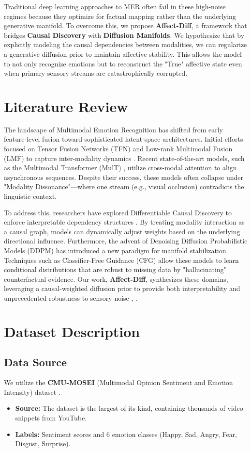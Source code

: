 \documentclass[conference]{IEEEtran}
\begin{document}
Traditional deep learning approaches to MER often fail in these high-noise regimes because they optimize for factual mapping rather than the underlying generative manifold. To overcome this, we propose \textbf{Affect-Diff}, a framework that bridges \textbf{Causal Discovery} with \textbf{Diffusion Manifolds}. We hypothesize that by explicitly modeling the causal dependencies between modalities, we can regularize a generative diffusion prior to maintain affective stability. This allows the model to not only recognize emotions but to reconstruct the "True" affective state even when primary sensory streams are catastrophically corrupted.

\section{Literature Review}
The landscape of Multimodal Emotion Recognition has shifted from early feature-level fusion toward sophisticated latent-space architectures. Initial efforts focused on Tensor Fusion Networks (TFN) and Low-rank Multimodal Fusion (LMF) to capture inter-modality dynamics \cite{b2}. Recent state-of-the-art models, such as the Multimodal Transformer (MulT) \cite{b4}, utilize cross-modal attention to align asynchronous sequences. Despite their success, these models often collapse under "Modality Dissonance"—where one stream (e.g., visual occlusion) contradicts the linguistic context. 

To address this, researchers have explored Differentiable Causal Discovery to enforce interpretable dependency structures \cite{b6}. By treating modality interaction as a causal graph, models can dynamically adjust weights based on the underlying directional influence. Furthermore, the advent of Denoising Diffusion Probabilistic Models (DDPM) \cite{b1} has introduced a new paradigm for manifold stabilization. Techniques such as Classifier-Free Guidance (CFG) \cite{b3} allow these models to learn conditional distributions that are robust to missing data by "hallucinating" counterfactual evidence. Our work, \textbf{Affect-Diff}, synthesizes these domains, leveraging a causal-weighted diffusion prior to provide both interpretability and unprecedented robustness to sensory noise \cite{b9}, \cite{b10}.

\section{Dataset Description}
\subsection{Data Source}
We utilize the \textbf{CMU-MOSEI} (Multimodal Opinion Sentiment and Emotion Intensity) dataset \cite{b2}.
\begin{itemize}
\item \textbf{Source:} The dataset is the largest of its kind, containing thousands of video snippets from YouTube.
\item \textbf{Labels:} Sentiment scores and 6 emotion classes (Happy, Sad, Angry, Fear, Disgust, Surprise).
\end{itemize}
\end{document}
